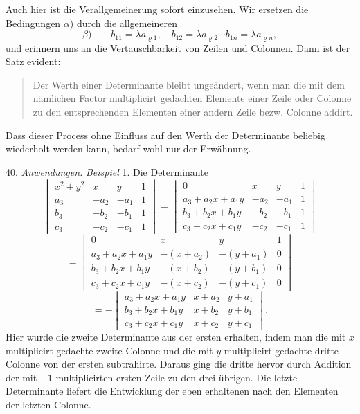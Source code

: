 \documentclass[11pt]{article}
\providecommand{\weberpage}[1]{}
\begin{document}
\weberpage{43}
Auch hier ist die Verallgemeinerung sofort einzusehen. Wir ersetzen die Bedingungen $\alpha$) durch die allgemeineren
\[
\beta)\qquad b_{11} = \lambda a_{\varrho 1}, \quad b_{12} = \lambda a_{\varrho 2} \cdots b_{1n} = \lambda a_{\varrho n},
\]
und erinnern uns an die Vertauschbarkeit von Zeilen und Colonnen. Dann ist der Satz evident:
\begin{quote}
\glqq Der Werth einer Determinante bleibt ungeändert, wenn man die mit dem nämlichen Factor multiplicirt gedachten Elemente einer Zeile oder Colonne zu den entsprechenden Elementen einer andern Zeile bezw. Colonne addirt.\grqq{}
\end{quote}
Dass dieser Process ohne Einfluss auf den Werth der Determinante beliebig wiederholt werden kann, bedarf wohl nur der Erwähnung.

40. \textit{Anwendungen.} \textit{Beispiel} 1. Die Determinante
\[
\begin{vmatrix} x^2+y^2 & x & y & 1\\ a_3 & -a_2 & -a_1 & 1\\ b_3 & -b_2 & -b_1 & 1\\ c_3 & -c_2 & -c_1 & 1\end{vmatrix}
= \begin{vmatrix} 0 & x & y & 1\\ a_3+a_2 x+a_1 y & -a_2 & -a_1 & 1\\ b_3+b_2 x+b_1 y & -b_2 & -b_1 & 1\\ c_3+c_2 x+c_1 y & -c_2 & -c_1 & 1\end{vmatrix}
\]
\[
= \begin{vmatrix} 0 & x & y & 1\\ a_3+a_2 x+a_1 y & -(x+a_2) & -(y+a_1) & 0\\ b_3+b_2 x+b_1 y & -(x+b_2) & -(y+b_1) & 0\\ c_3+c_2 x+c_1 y & -(x+c_2) & -(y+c_1) & 0\end{vmatrix}
\]
\[
= -\begin{vmatrix} a_3+a_2 x+a_1 y & x+a_2 & y+a_1\\ b_3+b_2 x+b_1 y & x+b_2 & y+b_1\\ c_3+c_2 x+c_1 y & x+c_2 & y+c_1\end{vmatrix}.
\]
Hier wurde die zweite Determinante aus der ersten erhalten, indem man die mit $x$ multiplicirt gedachte zweite Colonne und die mit $y$ multiplicirt gedachte dritte Colonne von der ersten subtrahirte. Daraus ging die dritte hervor durch Addition der mit $-1$ multiplicirten ersten Zeile zu den drei übrigen. Die letzte Determinante liefert die Entwicklung der eben erhaltenen nach den Elementen der letzten Colonne.
\end{document}
